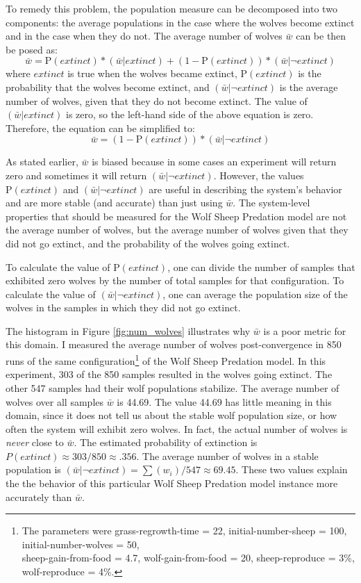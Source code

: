 To remedy this problem, the population measure can be decomposed into two components: the average populations in the case where the wolves become extinct and in the case when they do not.
The average number of wolves $\bar w$ can be then be posed as:
\[\bar w = \mathrm{P}(extinct) * (\bar w | extinct) + (1 - \mathrm{P}(extinct)) * (\bar w | \neg extinct) \]
where $extinct$ is true when the wolves became extinct, $\mathrm{P}(extinct)$ is the probability that the wolves become extinct, and $(\bar w | \neg extinct)$ is the average number of wolves, given that they do not become extinct.
The value of $(\bar w | extinct)$ is zero, so the left-hand side of the above equation is zero.
Therefore, the equation can be simplified to:
\[\bar w = (1 - \mathrm{P}(extinct)) * (\bar w | \neg extinct) \]

As stated earlier, $\bar w$ is biased because in some cases an experiment will return zero and sometimes it will return $(\bar w | \neg extinct)$.
However, the values $\mathrm{P}(extinct)$ and $(\bar  w | \neg extinct)$ are useful in describing the system's behavior and are more stable (and accurate) than just using $\bar w$.
The system-level properties that should be measured for the Wolf Sheep Predation model are not the average number of wolves, but the average number of wolves given that they did not go extinct, and the probability of the wolves going extinct.

To calculate the value of $\mathrm{P}(extinct)$, one can divide the number of samples that exhibited zero wolves by the number of total samples for that configuration.
To calculate the value of $(\bar w | \neg extinct)$, one can average the population size of the wolves in the samples in which they did not go extinct.

The histogram in Figure \ref{fig:num_wolves} illustrates why $\bar w$ is a poor metric for this domain.
I measured the average number of wolves post-convergence in 850 runs of the same configuration\footnote{The parameters were grass-regrowth-time = 22, initial-number-sheep = 100, initial-number-wolves = 50, \\
sheep-gain-from-food = 4.7, wolf-gain-from-food = 20, sheep-reproduce = 3\%, wolf-reproduce = 4\%. } of the Wolf Sheep Predation model.
In this experiment, 303 of the 850 samples resulted in the wolves going extinct.
The other 547 samples had their wolf populations stabilize.
The average number of wolves over all samples $\bar w$ is 44.69.
The value 44.69 has little meaning in this domain, since it does not tell us about the stable wolf population size, or how often the system will exhibit zero wolves.
In fact, the actual number of wolves is \textit{never} close to $\bar w$.
The estimated probability of extinction is $P(extinct) \approx 303 / 850 \approx .356$.
The average number of wolves in a stable population is $(\bar w | \neg extinct) = \sum (w_i) / 547 \approx 69.45$.
These two values explain the the behavior of this particular Wolf Sheep Predation model instance more accurately than $\bar w$.

